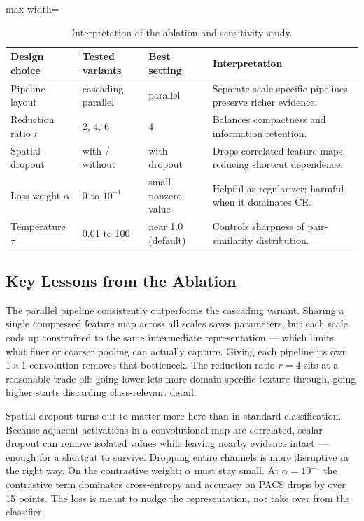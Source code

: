 \documentclass[11pt,a4paper]{article}
\begin{document}
\begin{table}[H]
\centering
\caption{Interpretation of the ablation and sensitivity study.}
\label{tab:ablation_interpretation}
\small
\begin{adjustbox}{max width=\textwidth}
\begin{tabular}{llll}
\toprule
\rowcolor{headerblue}
Design choice       & Tested variants    & Best setting          & Interpretation \\
\midrule
Pipeline layout     & cascading, parallel & parallel             & Separate scale-specific pipelines preserve richer evidence. \\
Reduction ratio $r$ & 2, 4, 6            & 4                    & Balances compactness and information retention. \\
Spatial dropout     & with / without     & with dropout         & Drops correlated feature maps, reducing shortcut dependence. \\
Loss weight $\alpha$ & $0$ to $10^{-1}$ & small nonzero value  & Helpful as regularizer; harmful when it dominates CE. \\
Temperature $\tau$  & 0.01 to 100        & near 1.0 (default)   & Controls sharpness of pair-similarity distribution. \\
\bottomrule
\end{tabular}
\end{adjustbox}
\end{table}

\subsection{Key Lessons from the Ablation}

The parallel pipeline consistently outperforms the cascading variant.  Sharing a
single compressed feature map across all scales saves parameters, but each scale
ends up constrained to the same intermediate representation — which limits what
finer or coarser pooling can actually capture.  Giving each pipeline its own
$1{\times}1$ convolution removes that bottleneck.  The reduction ratio $r=4$
sits at a reasonable trade-off: going lower lets more domain-specific texture
through, going higher starts discarding class-relevant detail.

Spatial dropout turns out to matter more here than in standard classification.
Because adjacent activations in a convolutional map are correlated, scalar dropout
can remove isolated values while leaving nearby evidence intact — enough for a
shortcut to survive.  Dropping entire channels is more disruptive in the right
way.  On the contrastive weight: $\alpha$ must stay small.  At $\alpha=10^{-1}$
the contrastive term dominates cross-entropy and accuracy on PACS drops by over
15 points.  The loss is meant to nudge the representation, not take over from the
classifier.
\end{document}
